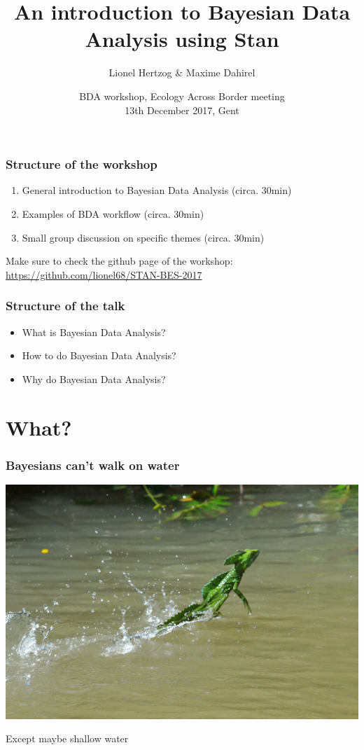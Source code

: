 \documentclass{beamer}
\title{An introduction to Bayesian Data Analysis using Stan}
\subtitle{}
\author{Lionel Hertzog \& Maxime Dahirel}
\date{BDA workshop, Ecology Across Border meeting\\ 13th December 2017, Gent}
\begin{document}
 
 \frame{\titlepage}
 

\begin{frame}
 \frametitle{\bf Structure of the workshop}
  \begin{enumerate}
   \item General introduction to Bayesian Data Analysis (circa. 30min)
   \item Examples of BDA workflow (circa. 30min)
   \item Small group discussion on specific themes (circa. 30min)
  \end{enumerate}
  
  Make sure to check the github page of the workshop: \url{https://github.com/lionel68/STAN-BES-2017}

 
 \end{frame}
 
\begin{frame}
 \frametitle{\bf Structure of the talk}
  \begin{itemize}
   \item What is Bayesian Data Analysis?
   \item How to do Bayesian Data Analysis?
   \item Why do Bayesian Data Analysis?
  \end{itemize}

 
 \end{frame} 
 
 
\section*{What?} 

 
 \begin{frame}
  \frametitle{\bf Bayesians can't walk on water}

 \includegraphics[width=\linewidth,height=\textheight,keepaspectratio]{water.jpg}
 
 Except maybe shallow water
  
 \end{frame}
 
\end{document}
